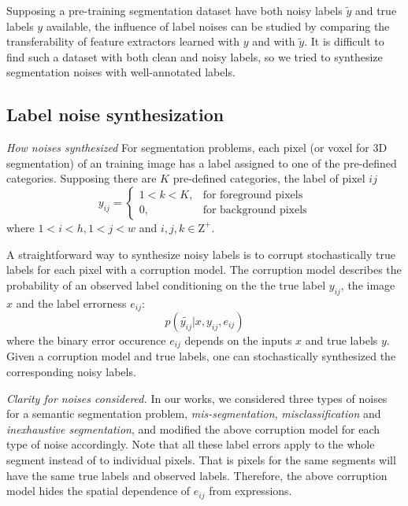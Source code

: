 Supposing a pre-training segmentation dataset have both noisy labels $\tilde{y}$ and true labels $y$ available, the influence of label noises can be studied by comparing the transferability of feature extractors learned with $y$ and with $\tilde{y}$. It is difficult to find such a dataset with both clean and noisy labels, so we tried to synthesize segmentation noises with well-annotated labels.

\subsection{Label noise synthesization}
\label{subsec:noises}

\noindent \textit{How noises synthesized}
\noindent
For segmentation problems, each pixel (or voxel for 3D segmentation) of an training image has a label assigned to one of the pre-defined categories.
Supposing there are $K$ pre-defined categories, the label of pixel ${ij}$
\[
  y_{ij} =
    \begin{cases}
      1 < k < K, & \text{for foreground pixels} \\
      0, & \text{for background pixels}
    \end{cases}
\]
where $1 < i < h, 1 < j < w$ and $i,j,k \in \mathrm{Z}^+$.

A straightforward way to synthesize noisy labels is to corrupt stochastically true labels for each pixel with a corruption model.
The corruption model describes the probability of an observed label conditioning on the the true label $y_{ij}$, the image $x$ and the label errorness $e_{ij}$:
$$p(\tilde{y_{ij}} \vert x, y_{ij}, e_{ij})$$
where the binary error occurence $e_{ij}$ depends on the inputs $x$ and true labels $y$.
Given a corruption model and true labels, one can stochastically synthesized the corresponding noisy labels.

\noindent \textit{Clarity for noises considered.}
In our works, we considered three types of noises for a semantic segmentation problem, \textit{mis-segmentation}, \textit{misclassification} and \textit{inexhaustive segmentation}, and modified the above corruption model for each type of noise accordingly.
Note that all these label errors apply to the whole segment instead of to individual pixels.
That is pixels for the same segments will have the same true labels and observed labels.
Therefore, the above corruption model hides the spatial dependence of $e_{ij}$ from expressions.

